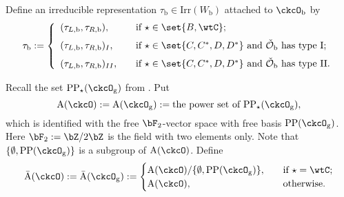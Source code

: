 \documentclass[12pt,a4paper]{amsart}
\newcommand{\CO}{{\mathcal {O}}}
\newcommand{\Z}{\mathbb{Z}}
\newcommand{\la}{\langle}
\newcommand{\ra}{\rangle}
\numberwithin{equation}{section}
\theoremstyle{remark}
\def\Irr{\mathrm{Irr}}
\def\CPP{\mathrm{PP}}
\def\CPPs{\mathrm{PP}_{\star}}
\begin{document}
 Define an irreducible  representation $\tau_{\mathrm b}\in \Irr(W_{\mathrm b})$ attached to $\ckcO_{\mathrm b}$ by
\begin{equation}\label{eq:taub}
 \tau_{\mathrm b}:= \left\{
     \begin{array}{ll}
       ( \tau_{L,\mathrm b}, \tau_{R,\mathrm b}), \quad
       & \text{if } \star \in \set{B,\wtC}; \medskip\\
         ( \tau_{L,\mathrm b}, \tau_{R,\mathrm b})_I, \quad & \text{if $\star \in \set{C,C^{*}, D,D^{*}}$ and $\check \CO_\mathrm b$ has type I;}\medskip\\
        ( \tau_{L,\mathrm b}, \tau_{R,\mathrm b})_{II}, \quad & \text{if $\star \in \set{C,C^{*}, D,D^{*}}$ and $\check \CO_\mathrm b$ has type II}.
\end{array}
  \right.
\end{equation}



Recall the set  $\CPPs(\ckcO_{\mathrm g})$ from   .   Put
  \[
    {\mathrm A}(\ckcO) := {\mathrm A}(\ckcO_{\mathrm g}):= \textrm{the power set of $\CPPs(\ckcO_{\mathrm g})$},
    \]
    which is identified with the free $\bF_2$-vector space with free basis $\CPP(\ckcO_{\mathrm g})$. Here $\bF_{2}:=\bZ/2\bZ$ is the field with two elements only.
Note that   $\{\emptyset, \CPP(\ckcO_{\mathrm g})\}$ is a subgroup of ${\mathrm A}(\ckcO)$.  Define
   \begin{equation*}%
  \bar{\mathrm A}(\ckcO):= \bar{\mathrm A}(\ckcO_{\mathrm g}):=
  \begin{cases}
 {\mathrm A}(\ckcO)/\{\emptyset, \CPP(\ckcO_{\mathrm g})\}, & \quad \text{if  } \star =\wtC;\\
 {\mathrm A}(\ckcO),  & \quad \text{otherwise.}
  \end{cases}
  \end{equation*}
\end{document}

